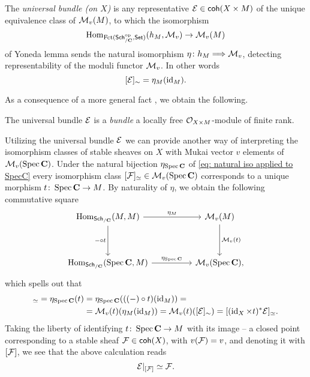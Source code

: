 \begin{definition}
    The \emph{universal bundle (on $X$)} is any representative $\mathcal E \in \mathsf{coh}(X \times M)$ of the unique equivalence class of $\mathcal M_v(M)$, to which the isomorphism 
    \[
        \operatorname{Hom}_{\operatorname{Fct(\mathsf{Sch}_{/\mathbf C}^{\text{op}}, \mathsf{Set})}}(h_M, \mathcal M_v) \to \mathcal M_v(M)
    \]
    of Yoneda lemma sends the natural isomorphism $\eta \colon h_M \Longrightarrow \mathcal M_v$, detecting representability of the moduli functor $\mathcal M_v$. In other words 
    \[
        [\mathcal E]_\sim = \eta_M(\operatorname{id}_{M}).
    \]
\end{definition}

As a consequence of a more general fact \cite[text]{keylist}, we obtain the following. 

\begin{theorem}
    The universal bundle $\mathcal E$ is a \emph{bundle} \ie a locally free ${\mathcal{O}_{X \times M}}$-module of finite rank. 
\end{theorem}

\begin{remark}
    \label{Points of M are sheaves}
Utilizing the universal bundle $\mathcal E$ we can provide another way of interpreting the isomorphism classes of stable sheaves on $X$ with Mukai vector $v$ \ie elements of $\mathcal M_v(\operatorname{Spec}\mathbf C)$. Under the natural bijection $\eta_{\operatorname{Spec}\mathbf C}$ of \eqref{eq: natural iso applied to SpecC} every isomorphism class $[\mathcal F]_\simeq \in \mathcal M_v(\operatorname{Spec}\mathbf C)$ corresponds to a unique morphism $t \colon \operatorname{Spec}\mathbf C \to M$. By naturality of $\eta$, we obtain the following commutative square 
\[\begin{tikzcd}[column sep = normal, row sep = 1.8em]
	\Hom_{\sch{\C}}(M, M) && \M_v(M) \\
	\\
	\Hom_{\sch{\C}}(\spec{\C}, M) && \M_v(\spec{\C}),
	\arrow["{\eta_M}", from=1-1, to=1-3]
	\arrow["{- \circ t}"', from=1-1, to=3-1]
	\arrow["{\M_v(t)}", from=1-3, to=3-3]
	\arrow["\eta_{\spec{\C}}", from=3-1, to=3-3]
\end{tikzcd}\]
which spells out that 
\begin{align*}
    [\F]_\iso = \eta_{\spec{\C}}(t) &= \eta_{\spec{\C}}(((-)\circ t)(\id{M})) = \\
    &= \M_v(t)(\eta_M(\id{M})) = \M_v(t)([\E]_\sim) = [(\id{X} \times t)^*\E]_\iso.
\end{align*}
Taking the liberty of identifying $t \colon \operatorname{Spec}\mathbf C \to M$ with its image -- a closed point corresponding to a stable sheaf $\mathcal F \in \mathsf{coh}(X)$, with $v(\mathcal F) = v$, and denoting it with $[\mathcal F]$, we see that the above calculation reads
\[
    \mathcal E|_{[\mathcal F]} \simeq \mathcal F.
\]
\end{remark}

